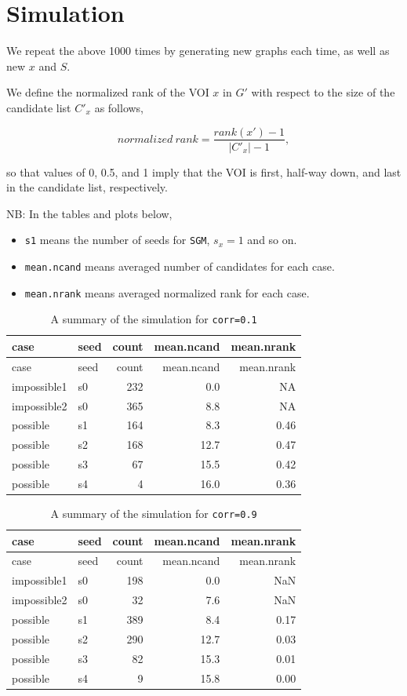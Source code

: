 \documentclass[
]{article}
\providecommand{\tightlist}{%
  \setlength{\itemsep}{0pt}\setlength{\parskip}{0pt}}
\begin{document}
\hypertarget{simulation}{%
\section{Simulation}\label{simulation}}

We repeat the above 1000 times by generating new graphs each time, as
well as new \(x\) and \(S\).

We define the normalized rank of the VOI \(x\) in \(G'\) with respect to
the size of the candidate list \(C'_x\) as follows,

\[normalized~rank = \frac{rank(x') -1}{|C'_x|-1},\]

so that values of 0, 0.5, and 1 imply that the VOI is first, half-way
down, and last in the candidate list, respectively.

NB: In the tables and plots below,

\begin{itemize}
\tightlist
\item
  \texttt{s1} means the number of seeds for \texttt{SGM}, \(s_x=1\) and
  so on.
\item
  \texttt{mean.ncand} means averaged number of candidates for each case.
\item
  \texttt{mean.nrank} means averaged normalized rank for each case.
\end{itemize}

\begin{longtable}[]{@{}llrrr@{}}
\caption{A summary of the simulation for
\texttt{corr=0.1}}\tabularnewline
\toprule
case & seed & count & mean.ncand & mean.nrank\tabularnewline
\midrule
\endfirsthead
\toprule
case & seed & count & mean.ncand & mean.nrank\tabularnewline
\midrule
\endhead
impossible1 & s0 & 232 & 0.0 & NA\tabularnewline
impossible2 & s0 & 365 & 8.8 & NA\tabularnewline
possible & s1 & 164 & 8.3 & 0.46\tabularnewline
possible & s2 & 168 & 12.7 & 0.47\tabularnewline
possible & s3 & 67 & 15.5 & 0.42\tabularnewline
possible & s4 & 4 & 16.0 & 0.36\tabularnewline
\bottomrule
\end{longtable}

\begin{longtable}[]{@{}llrrr@{}}
\caption{A summary of the simulation for
\texttt{corr=0.9}}\tabularnewline
\toprule
case & seed & count & mean.ncand & mean.nrank\tabularnewline
\midrule
\endfirsthead
\toprule
case & seed & count & mean.ncand & mean.nrank\tabularnewline
\midrule
\endhead
impossible1 & s0 & 198 & 0.0 & NaN\tabularnewline
impossible2 & s0 & 32 & 7.6 & NaN\tabularnewline
possible & s1 & 389 & 8.4 & 0.17\tabularnewline
possible & s2 & 290 & 12.7 & 0.03\tabularnewline
possible & s3 & 82 & 15.3 & 0.01\tabularnewline
possible & s4 & 9 & 15.8 & 0.00\tabularnewline
\bottomrule
\end{longtable}
\end{document}

